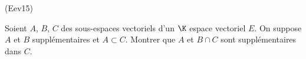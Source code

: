 \begin{tiny}(Eev15) \end{tiny}Soient $A$, $B$, $C$ des sous-espaces vectoriels d'un $\K$ espace vectoriel $E$. On suppose $A$ et $B$ supplémentaires et $A\subset C$.\newline
Montrer que $A$ et $B\cap C$ sont supplémentaires dans $C$.